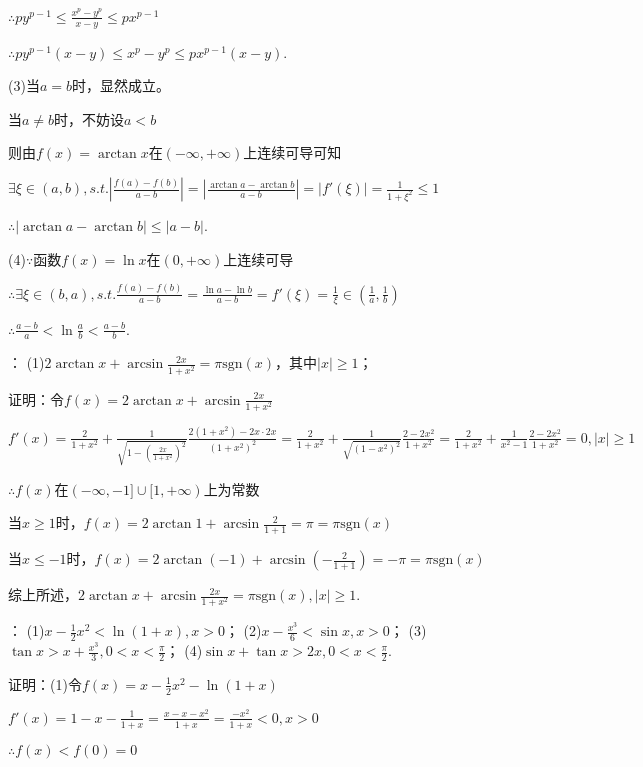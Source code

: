 \documentclass[12pt,UTF8]{ctexart}
\begin{document}
\begin{enumerate}
$\therefore py^{p-1}\leq\frac{x^p-y^p}{x-y}\leq px^{p-1}$

$\therefore py^{p-1}(x-y)\leq x^p-y^p\leq px^{p-1}(x-y)$.

(3)当$a=b$时，显然成立。

当$a\neq b$时，不妨设$a<b$

则由$f(x)=\arctan x$在$(-\infty,+\infty)$上连续可导可知

$\exists\xi\in(a,b),s.t.|\frac{f(a)-f(b)}{a-b}|=|\frac{\arctan a-\arctan b}{a-b}|=|f'(\xi)|=\frac1{1+\xi^2}\leq1$

$\therefore|\arctan a-\arctan b|\leq|a-b|$.

(4)$\because$函数$f(x)=\ln x$在$(0,+\infty)$上连续可导

$\therefore\exists\xi\in(b,a),s.t.\frac{f(a)-f(b)}{a-b}=\frac{\ln a-\ln b}{a-b}=f'(\xi)=\frac1\xi\in(\frac1a,\frac1b)$

$\therefore\frac{a-b}a<\ln\frac ab<\frac{a-b}b$.

：
\newline
(1)$2\arctan x+\arcsin\frac{2x}{1+x^2}=\pi\text{sgn}(x)$，其中$|x|\geq1$；

证明：令$f(x)=2\arctan x+\arcsin\frac{2x}{1+x^2}$

$f'(x)=\frac2{1+x^2}+\frac1{\sqrt{1-(\frac{2x}{1+x^2})^2}}\frac{2(1+x^2)-2x\cdot2x}{(1+x^2)^2}=\frac2{1+x^2}+\frac1{\sqrt{(1-x^2)^2}}\frac{2-2x^2}{1+x^2}=\frac2{1+x^2}+\frac1{x^2-1}\frac{2-2x^2}{1+x^2}=0,|x|\geq1$

$\therefore f(x)$在$(-\infty,-1]\cup[1,+\infty)$上为常数

当$x\geq1$时，$f(x)=2\arctan1+\arcsin\frac2{1+1}=\pi=\pi\text{sgn}(x)$

当$x\leq-1$时，$f(x)=2\arctan(-1)+\arcsin(-\frac2{1+1})=-\pi=\pi\text{sgn}(x)$

综上所述，$2\arctan x+\arcsin\frac{2x}{1+x^2}=\pi\text{sgn}(x),|x|\geq1$.

：
\newline
(1)$x-\frac12x^2<\ln(1+x),x>0$；
\newline
(2)$x-\frac{x^3}6<\sin x,x>0$；
\newline
(3)$\tan x>x+\frac{x^3}3,0<x<\frac\pi2$；
\newline
(4)$\sin x+\tan x>2x,0<x<\frac\pi2$.

证明：(1)令$f(x)=x-\frac12x^2-\ln(1+x)$

$f'(x)=1-x-\frac1{1+x}=\frac{x-x-x^2}{1+x}=\frac{-x^2}{1+x}<0,x>0$

$\therefore f(x)<f(0)=0$


\end{enumerate}
\end{document}
